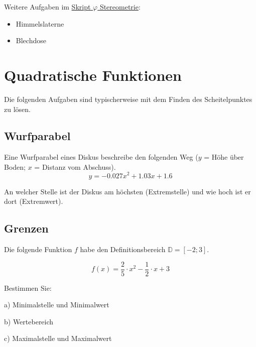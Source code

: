 


\renewcommand{\metaHeaderLine}{Extremwertaufgaben}
\renewcommand{\arbeitsblattTitel}{Extremwertaufgaben}


\arbeitsblattHeader{}

Weitere Aufgaben im \href{https://olat.bbw.ch/auth/RepositoryEntry/572162090/CourseNode/109695301829998}{Skript $\varphi$ Stereometrie}:

\begin{itemize}
\item Himmelslaterne
\item Blechdose
\end{itemize}

\newpage

\section{Quadratische Funktionen}
Die folgenden Aufgaben sind typischerweise mit dem Finden des
Scheitelpunktes zu lösen.

\subsection{Wurfparabel}
Eine Wurfparabel eines Diskus beschreibe den folgenden Weg ($y$ = Höhe über Boden;
$x$ = Distanz vom Abschuss).
$$y =-0.027 x^2 + 1.03x + 1.6$$

An welcher Stelle ist der Diskus am höchsten (Extremstelle) und wie
hoch ist er dort (Extremwert).

\subsection{Grenzen}
Die folgende Funktion $f$ habe den Definitionsbereich
$\mathbb{D}=[-2;3]$.

$$f(x) = \frac25\cdot{}x^2 - \frac12\cdot{}x + 3$$

Bestimmen Sie:

a) Minimalstelle und Minimalwert

b) Wertebereich

c) Maximalstelle und Maximalwert


